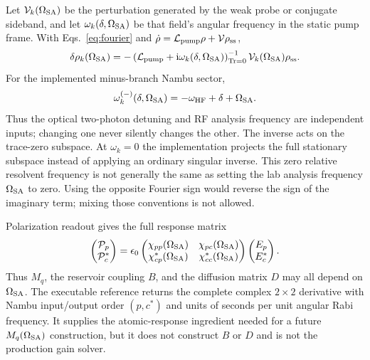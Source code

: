 \documentclass[11pt,a4paper]{article}
\newcommand{\ii}{\mathrm i}
\newcommand{\Tr}{\operatorname{Tr}}
\begin{document}
Let $\mathcal V_k(\Omega_{\rm SA})$ be the perturbation generated by the weak
probe or conjugate sideband, and let $\omega_k(\delta,\Omega_{\rm SA})$ be that
field's angular frequency in the static pump frame. With
Eqs.~\eqref{eq:fourier} and
$\dot\rho=\mathcal L_{\rm pump}\rho+\mathcal V\rho_{\rm ss}$,
\begin{equation}
\delta\rho_k(\Omega_{\rm SA})=
-\left(\mathcal L_{\rm pump}+\ii\omega_k(\delta,\Omega_{\rm SA})\right)^{-1}_{\Tr=0}
\mathcal V_k(\Omega_{\rm SA})\rho_{\rm ss}.
\label{eq:linear-resolvent}
\end{equation}
For the implemented minus-branch Nambu sector,
\begin{equation}
\omega_k^{(-)}(\delta,\Omega_{\rm SA})
=-\omega_{\rm HF}+\delta+\Omega_{\rm SA}.
\label{eq:pump-frame-response-frequency}
\end{equation}
Thus the optical two-photon detuning and RF analysis frequency are independent
inputs; changing one never silently changes the other. The inverse acts on the
trace-zero subspace. At $\omega_k=0$ the implementation projects the full
stationary subspace instead of applying an ordinary singular inverse. This
zero relative resolvent frequency is not generally the same as setting the lab
analysis frequency $\Omega_{\rm SA}$ to zero. Using the opposite Fourier sign
would reverse the sign of the imaginary term; mixing those conventions is not
allowed.

Polarization readout gives the full response matrix
\begin{equation}
\begin{pmatrix}\mathcal P_p\\\mathcal P_c^*\end{pmatrix}
=\epsilon_0
\begin{pmatrix}
\chi_{pp}(\Omega_{\rm SA})&\chi_{pc}(\Omega_{\rm SA})\\
\chi_{cp}^*(\Omega_{\rm SA})&\chi_{cc}^*(\Omega_{\rm SA})
\end{pmatrix}
\begin{pmatrix}E_p\\E_c^*\end{pmatrix}.
\label{eq:chi-matrix}
\end{equation}
Thus $M_q$, the reservoir coupling $B$, and the diffusion matrix $D$ may all
depend on $\Omega_{\rm SA}$.
The executable reference returns the complete complex $2\times2$ derivative
with Nambu input/output order $(p,c^*)$ and units of seconds per unit angular
Rabi frequency. It supplies the atomic-response ingredient needed for a future
$M_q(\Omega_{\rm SA})$ construction, but it does not construct $B$ or $D$ and
is not the production gain solver.
\end{document}
